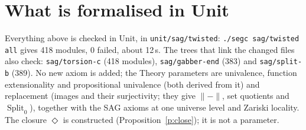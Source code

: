 \documentclass[11pt]{amsart}
\theoremstyle{definition}
\theoremstyle{remark}
\newcommand{\Split}{\operatorname{Split}}
\newcommand{\close}{\Diamond}
\newcommand{\tr}[1]{\|#1\|}
\newcommand{\code}[1]{\texttt{#1}}
\begin{document}
\section{What is formalised in Unit}

Everything above is checked in Unit, in \code{unit/sag/twisted}:
\code{./segc sag/twisted all} gives 418 modules, 0 failed, about 12\,s.
The trees that link the changed files also check: \code{sag/torsion-c}
(418 modules), \code{sag/gabber-end} (383) and \code{sag/split-b} (389). No
new axiom is added; the Theory parameters are univalence, function
extensionality and propositional univalence (both derived from it) and
replacement (images and their surjectivity; they give $\tr{-}$, set
quotients and $\Split_0$), together with the SAG axioms at one universe
level and Zariski locality. The closure $\close$ is constructed
(Proposition~\ref{p:close}); it is not a parameter.
\end{document}
